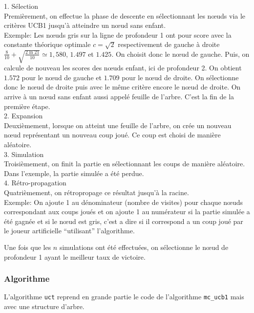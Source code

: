 \documentclass[a4paper]{article}
\theoremstyle{definition}
\begin{document}
1. Sélection\\
Premièrement, on effectue la phase de descente en sélectionnant les nœuds via le critères UCB1 jusqu'à atteindre un nœud sans enfant.\\
Exemple: Les nœuds gris sur la ligne de profondeur 1 ont pour score avec la constante théorique optimale $c=\sqrt{2}$ respectivement de gauche à droite $\frac{8}{10} + \sqrt{\frac{2\ln{21}}{10}} \simeq 1,580$, $1.497$ et $1.425$. On choisit donc le nœud de gauche. Puis, on calcule de nouveau les scores des nœuds enfant, ici de profondeur 2. On obtient $1.572$ pour le nœud de gauche et $1.709$ pour le nœud de droite. On sélectionne donc le nœud de droite puis avec le même critère encore le nœud de droite. On arrive à un nœud sans enfant aussi appelé feuille de l'arbre. C'est la fin de la première étape.
\\

2. Expansion\\
Deuxièmement, lorsque on atteint une feuille de l'arbre, on crée un nouveau nœud représentant un nouveau coup joué. Ce coup est choisi de manière aléatoire.\\

3. Simulation\\
Troisièmement, on finit la partie en sélectionnant les coups de manière aléatoire. Dans l'exemple, la partie simulée a été perdue.\\

4. Rétro-propagation\\
Quatrièmement, on rétropropage ce résultat jusqu'à la racine.\\
Exemple: On ajoute 1 au dénominateur (nombre de visites) pour chaque nœuds correspondant aux coups joués et on ajoute 1 au numérateur si la partie simulée a été gagnée et si le nœud est gris, c'est a dire si il correspond a un coup joué par le joueur artificielle ``utilisant'' l'algorithme.

Une fois que les $n$ simulations ont été effectuées, on sélectionne le nœud de profondeur 1 ayant le meilleur taux de victoire.

\subsubsection{Algorithme}

L'algorithme \texttt{uct} reprend en grande partie le code de l'algorithme \texttt{mc\_ucb1} mais avec une structure d'arbre.
\end{document}
